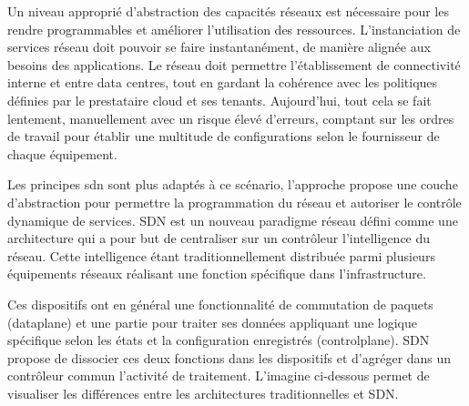 Un niveau approprié  d'abstraction des capacités réseaux est nécessaire pour les rendre programmables et améliorer l'utilisation des ressources. L’instanciation de services réseau doit pouvoir se faire instantanément, de manière alignée aux besoins des applications. Le réseau doit permettre l'établissement de connectivité interne et entre data centres, tout en gardant la cohérence avec les politiques définies par le prestataire cloud et ses tenants. Aujourd'hui, tout cela se fait lentement, manuellement avec un risque élevé d'erreurs, comptant sur les ordres de travail pour établir une  multitude  de configurations selon le fournisseur de chaque équipement.

Les principes \gls{sdn} sont plus adaptés à ce scénario, l'approche propose une couche d'abstraction pour permettre la programmation du réseau et autoriser le contrôle dynamique de services. SDN est un nouveau \gls{paradigme} réseau défini comme une architecture qui a pour but de centraliser  sur un contrôleur l'intelligence du réseau. Cette intelligence étant traditionnellement distribuée parmi plusieurs équipements réseaux réalisant une fonction spécifique dans l'infrastructure.

Ces dispositifs ont en général une fonctionnalité de commutation de paquets (\gls{dataplane}) et une partie pour traiter ses données appliquant une logique spécifique selon les états et la configuration enregistrés (\gls{controlplane}). SDN propose de dissocier ces deux fonctions dans les dispositifs et d'agréger dans un contrôleur commun l'activité de traitement. L'imagine ci-dessous permet de visualiser les différences entre les architectures traditionnelles et SDN. \\


